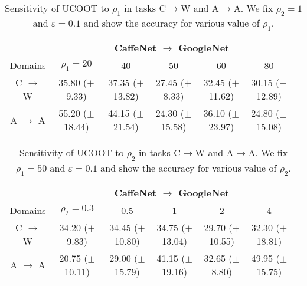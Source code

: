 \hfill
\begin{table}[H]
	\begin{center}
		\begin{footnotesize}
			\begin{sc}
				\begin{tabular}{c c c c c c c}
					\toprule
					& \multicolumn{5}{c}{CaffeNet $\to$ GoogleNet} \\
					\midrule
					Domains & $\rho_1= 20$ & 40 & 50 & 60 & 80 \\
					\midrule
					C $\to$ W & 35.80 ($\pm$ 9.33) & 37.35 ($\pm$ 13.82) & 27.45 ($\pm$ 8.33) & 32.45 ($\pm$ 11.62) & 30.15 ($\pm$ 12.89) \\
					\hline
					A $\to$ A & 55.20 ($\pm$ 18.44) & 44.15 ($\pm$ 21.54) & 24.30 ($\pm$ 15.58) & 36.10 ($\pm$ 23.97) & 24.80 ($\pm$ 15.08) \\
					\hline
				\end{tabular}
			\end{sc}
		\end{footnotesize}
	\end{center}
	\caption{Sensitivity of UCOOT to $\rho_1$ in tasks C$\to$W and A$\to$A.
  We fix $\rho_2 = 1$ and $\varepsilon = 0.1$ and show the accuracy for various value of
  $\rho_1$.} \label{tab:sensitiv_lambda1}
\end{table}

\hfill
\begin{table}[H]
	\begin{center}
		\begin{footnotesize}
			\begin{sc}
				\begin{tabular}{c c c c c c c}
					\toprule
					& \multicolumn{5}{c}{CaffeNet $\to$ GoogleNet} \\
					\midrule
					Domains & $\rho_2= 0.3$ & 0.5 & 1 & 2 & 4 \\
					\midrule
					C $\to$ W & 34.20 ($\pm$ 9.83) & 34.45 ($\pm$ 10.80) & 34.75 ($\pm$ 13.04) & 29.70 ($\pm$ 10.55) & 32.30 ($\pm$ 18.81) \\
					\hline
					A $\to$ A & 20.75 ($\pm$ 10.11) & 29.00 ($\pm$ 15.79) & 41.15 ($\pm$ 19.16) & 32.65 ($\pm$ 8.80) & 49.95 ($\pm$ 15.75) \\
					\hline
				\end{tabular}
			\end{sc}
		\end{footnotesize}
	\end{center}
	\caption{Sensitivity of UCOOT to $\rho_2$ in tasks C$\to$W and A$\to$A.
  We fix $\rho_1 = 50$ and $\varepsilon = 0.1$ and show the accuracy for various value of
  $\rho_2$.} \label{tab:sensitiv_lambda_2}
\end{table}

